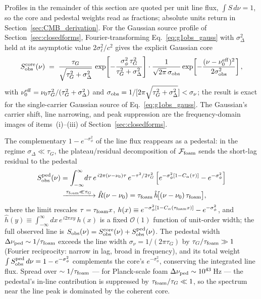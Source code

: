 \documentclass[aps,prd,onecolumn,amsmath,amssymb]{revtex4-2}
\begin{document}
Profiles in the remainder of this section are quoted per unit line
flux, $\int S\,d\nu=1$, so the core and pedestal weights read as fractions;
absolute units return in Section~\ref{sec:CMB_derivation}.
For the Gaussian source profile of Section~\ref{sec:closedforms},
Fourier-transforming Eq.~\eqref{eq:g1obs_gauss} with $\sigma_\Delta^2$
held at its asymptotic value $2\sigma_\ell^2/c^2$ gives the explicit
Gaussian core
\begin{equation}
  S_{\rm obs}^{\rm core}(\nu) \;=\;
    \frac{\tau_G}{\sqrt{\tau_G^2+\sigma_\Delta^2}}\,
    \exp\!\left[-\frac{\sigma_\phi^2\,\tau_G^2}{\tau_G^2+\sigma_\Delta^2}\right]
    \cdot
    \frac{1}{\sqrt{2\pi}\,\sigma_{\rm obs}}
    \exp\!\left[-\frac{(\nu-\nu_0^{\rm eff})^2}{2\sigma_{\rm obs}^2}\right],
  \label{eq:Sobs_gauss}
\end{equation}
with $\nu_0^{\rm eff}=\nu_0\tau_G^2/(\tau_G^2+\sigma_\Delta^2)$ and
$\sigma_{\rm obs}=1/[2\pi\sqrt{\tau_G^2+\sigma_\Delta^2}]<\sigma_\nu$; the
result is exact for the single-carrier Gaussian source of
Eq.~\eqref{eq:g1obs_gauss}.
The Gaussian's carrier shift, line narrowing, and peak suppression are
the frequency-domain images of items~(i)--(iii) of
Section~\ref{sec:closedforms}.

The complementary $1-e^{-\sigma_\phi^2}$ of the line flux reappears as a
pedestal: in the regime $\sigma_\Delta\ll\tau_G$, the plateau/residual
decomposition of $\mathcal{F}_{\rm foam}$ sends the short-lag residual to the
pedestal
\begin{align}
  S_{\rm obs}^{\rm ped}(\nu)
  &=\int_{-\infty}^{\infty}\!d\tau\,
    e^{\,i2\pi(\nu-\nu_0)\tau}\,e^{-\tau^2/2\tau_G^2}
    \left[e^{-\sigma_\phi^2[1-C_\alpha(\tau)]}-e^{-\sigma_\phi^2}\right] \notag\\
  &\xrightarrow{\;\tau_{\rm foam}\ll\tau_G\;}
    \hat{R}(\nu-\nu_0)=\tau_{\rm foam}\,\hat{h}\!\big[(\nu-\nu_0)\,\tau_{\rm foam}\big],
  \label{eq:Sobs_gauss_ped}
\end{align}
where the limit rescales $\tau=\tau_{\rm foam}x$, $h(x)\equiv
e^{-\sigma_\phi^2[1-C_\alpha(\tau_{\rm foam}x)]}-e^{-\sigma_\phi^2}$, and
$\hat{h}(y)\equiv\int_{-\infty}^{\infty}dx\,e^{\,i2\pi xy}\,h(x)$ is a fixed
$\mathcal{O}(1)$ function of unit-order width; the full observed line is
$S_{\rm obs}(\nu)=S_{\rm obs}^{\rm core}(\nu)+S_{\rm obs}^{\rm ped}(\nu)$.
The pedestal width $\Delta\nu_{\rm ped}\sim1/\tau_{\rm foam}$ exceeds the line
width $\sigma_\nu=1/(2\pi\tau_G)$ by $\tau_G/\tau_{\rm foam}\gg1$ (Fourier
reciprocity: narrow in lag, broad in frequency), and its total weight
$\int S_{\rm obs}^{\rm ped}\,d\nu=1-e^{-\sigma_\phi^2}$ complements the core's
$e^{-\sigma_\phi^2}$, conserving the integrated line flux.  Spread over
$\sim1/\tau_{\rm foam}$ --- for Planck-scale foam $\Delta\nu_{\rm ped}\sim10^{43}$\,Hz
--- the pedestal's in-line contribution is suppressed by $\tau_{\rm foam}/\tau_G\ll1$,
so the spectrum near the line peak is dominated by the coherent core.
\end{document}
